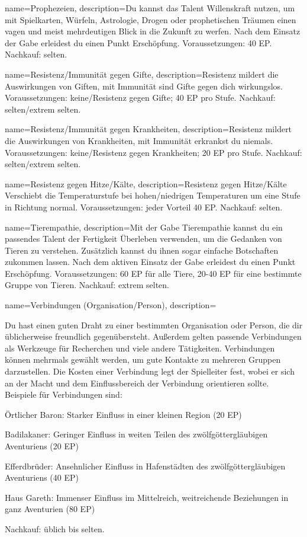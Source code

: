 {
    name={Prophezeien},
    description={Du kannst das Talent Willenskraft nutzen, um mit Spielkarten, Würfeln, Astrologie, Drogen oder prophetischen Träumen einen vagen und meist mehrdeutigen Blick in die Zukunft zu werfen. Nach dem Einsatz der Gabe erleidest du einen Punkt Erschöpfung. Voraussetzungen: 40 EP. Nachkauf: selten.}}

{
    name={Resistenz/Immunität gegen Gifte},
    description={Resistenz mildert die Auswirkungen von Giften, mit Immunität sind Gifte gegen dich wirkungslos. Voraussetzungen: keine/Resistenz gegen Gifte; 40 EP pro Stufe. Nachkauf: selten/extrem selten.}}

{
    name={Resistenz/Immunität gegen Krankheiten},
    description={Resistenz mildert die Auswirkungen von Krankheiten, mit Immunität erkrankst du niemals. Voraussetzungen: keine/Resistenz gegen Krankheiten; 20 EP pro Stufe. Nachkauf: selten/extrem selten.}}

{
    name={Resistenz gegen Hitze/Kälte},
    description={Resistenz gegen Hitze/Kälte Verschiebt die Temperaturstufe bei hohen/niedrigen Temperaturen um eine Stufe in Richtung normal. Voraussetzungen: jeder Vorteil 40 EP. Nachkauf: selten.}}

{
    name={Tierempathie},
    description={Mit der Gabe Tierempathie kannst du ein passendes Talent der Fertigkeit Überleben verwenden, um die Gedanken von Tieren zu verstehen. Zusätzlich kannst du ihnen sogar einfache Botschaften zukommen lassen. Nach dem aktiven Einsatz der Gabe erleidest du einen Punkt Erschöpfung. Voraussetzungen: 60 EP für alle Tiere, 20-40 EP für eine bestimmte Gruppe von Tieren. Nachkauf: extrem selten.}}

{
    name={Verbindungen (Organisation/Person)},
    description={Du hast einen guten Draht zu einer bestimmten Organisation oder Person, die dir üblicherweise freundlich gegenübersteht. Außerdem gelten passende Verbindungen als Werkzeuge für Recherchen und viele andere Tätigkeiten. Verbindungen können mehrmals gewählt werden, um gute Kontakte zu mehreren Gruppen darzustellen. Die Kosten einer Verbindung legt der Spielleiter fest, wobei er sich an der Macht und dem Einflussbereich der Verbindung orientieren sollte. Beispiele für Verbindungen sind:
\begin{description}
\item Örtlicher Baron: Starker Einfluss in einer kleinen Region (20 EP)
\item Badilakaner: Geringer Einfluss in weiten Teilen des zwölfgöttergläubigen Aventuriens (20 EP)
\item Efferdbrüder: Ansehnlicher Einfluss in Hafenstädten des zwölfgöttergläubigen Aventuriens (40 EP)
\item Haus Gareth: Immenser Einfluss im Mittelreich, weitreichende Beziehungen in ganz Aventurien (80 EP)
\end{description}
Nachkauf: üblich bis selten.
}}

